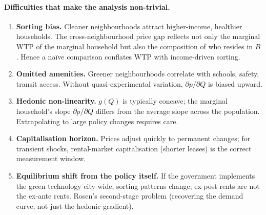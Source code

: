 \documentclass[11pt,a4paper]{article}
\begin{document}
\paragraph{Difficulties that make the analysis non-trivial.}
\begin{enumerate}[leftmargin=*,itemsep=2pt]
    \item \textbf{Sorting bias.} Cleaner neighbourhoods attract higher-income, healthier households. The cross-neighbourhood price gap reflects not only the marginal WTP of the marginal household but also the composition of who resides in $B$. Hence a naïve comparison conflates WTP with income-driven sorting.
    \item \textbf{Omitted amenities.} Greener neighbourhoods correlate with schools, safety, transit access. Without quasi-experimental variation, $\partial p/\partial Q$ is biased upward.
    \item \textbf{Hedonic non-linearity.} $g(Q)$ is typically concave; the marginal household's slope $\partial p/\partial Q$ differs from the average slope across the population. Extrapolating to large policy changes requires care.
    \item \textbf{Capitalisation horizon.} Prices adjust quickly to permanent changes; for transient shocks, rental-market capitalisation (shorter leases) is the correct measurement window.
    \item \textbf{Equilibrium shift from the policy itself.} If the government implements the green technology city-wide, sorting patterns change; ex-post rents are not the ex-ante rents. Rosen's second-stage problem (recovering the demand curve, not just the hedonic gradient).
\end{enumerate}

\noindent{}
\end{document}
